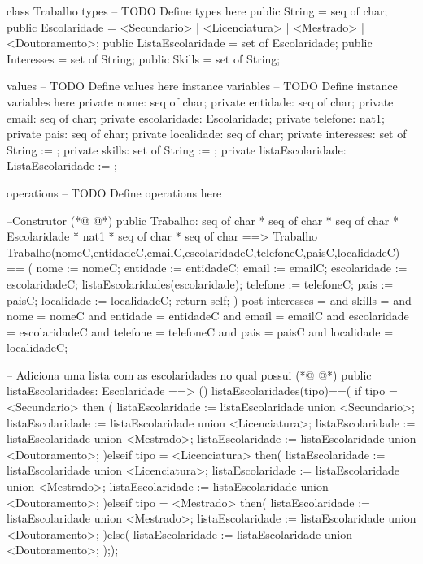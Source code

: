 \begin{vdmpp}[breaklines=true]
class Trabalho
types
-- TODO Define types here
 public String = seq of char;
 public Escolaridade = <Secundario> | <Licenciatura> | <Mestrado> | <Doutoramento>;
 public ListaEscolaridade = set of Escolaridade;
 public Interesses = set of String;
 public Skills = set of String;
 
values
-- TODO Define values here
instance variables
-- TODO Define instance variables here
 private nome: seq of char;
 private entidade: seq of char;
 private email: seq of char;
 private escolaridade: Escolaridade;
 private telefone: nat1;
 private pais: seq of char;
 private localidade: seq of char;
 private interesses: set of String := {};
 private skills: set of String := {};
 private listaEscolaridade: ListaEscolaridade := {};
 
operations
-- TODO Define operations here

 --Construtor
(*@
\label{Trabalho:29}
@*)
 public Trabalho: seq of char * seq of char * seq of char * Escolaridade * nat1 * seq of char * seq of char ==> Trabalho
 Trabalho(nomeC,entidadeC,emailC,escolaridadeC,telefoneC,paisC,localidadeC) == (
  nome := nomeC;
  entidade := entidadeC;
  email := emailC;
  escolaridade := escolaridadeC;
  listaEscolaridades(escolaridade);
  telefone := telefoneC;
  pais := paisC;
  localidade := localidadeC;
  return self;
 )
 post interesses = {} and
   skills = {} and
   nome = nomeC and
   entidade = entidadeC and
   email = emailC and
   escolaridade = escolaridadeC and
   telefone = telefoneC and
   pais = paisC and
   localidade = localidadeC;
 
 -- Adiciona uma lista com as escolaridades no qual possui
(*@
\label{listaEscolaridades:52}
@*)
 public listaEscolaridades: Escolaridade ==> ()
 listaEscolaridades(tipo)==(
 if tipo = <Secundario> then (
  listaEscolaridade := listaEscolaridade union {<Secundario>};
  listaEscolaridade := listaEscolaridade union {<Licenciatura>};
  listaEscolaridade := listaEscolaridade union {<Mestrado>};
  listaEscolaridade := listaEscolaridade union {<Doutoramento>};
 )elseif tipo = <Licenciatura> then(
  listaEscolaridade := listaEscolaridade union {<Licenciatura>};
  listaEscolaridade := listaEscolaridade union {<Mestrado>};
  listaEscolaridade := listaEscolaridade union {<Doutoramento>};
 )elseif tipo = <Mestrado> then(
  listaEscolaridade := listaEscolaridade union {<Mestrado>};
  listaEscolaridade := listaEscolaridade union {<Doutoramento>};
 )else(
  listaEscolaridade := listaEscolaridade union {<Doutoramento>};
 ););


\end{vdmpp}
